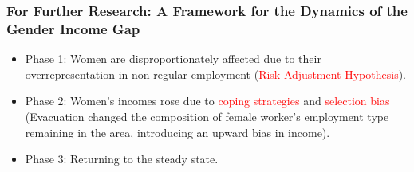 \documentclass[serif, aspectratio=169]{beamer}
\begin{document}
\begin{frame}[label=conclusion]

\frametitle{For Further Research: A Framework for the Dynamics of the Gender Income Gap}











    \begin{minipage}[c]{0.4\linewidth}
        \small

        \vspace{-1.4cm}
        

{\footnotesize


\begin{itemize} 

\item Phase 1: Women are disproportionately affected due to their overrepresentation in non-regular employment (\textcolor{red}{Risk Adjustment Hypothesis}). 
\item Phase 2: Women's incomes rose due to \textcolor{red}{coping strategies} and \textcolor{red}{selection bias} (Evacuation changed the composition of female worker's employment type remaining in the area, introducing an upward bias in income). 
\item Phase 3: Returning to the steady state. 
\end{itemize}

}
\end{minipage}
\end{frame}
\end{document}
